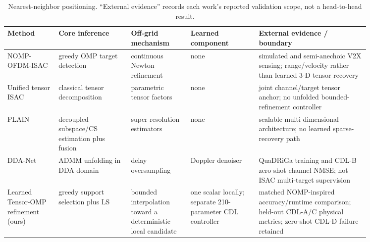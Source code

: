 \begin{table}[t]
\centering
\caption{Nearest-neighbor positioning. ``External evidence'' records each work's reported validation scope, not a head-to-head result.}
\label{tab:closest_work}
\footnotesize
\setlength{\tabcolsep}{3pt}
\begin{tabular}{p{0.12\linewidth}p{0.17\linewidth}p{0.14\linewidth}p{0.16\linewidth}p{0.26\linewidth}}
\toprule
Method & Core inference & Off-grid mechanism & Learned component & External evidence / boundary \\
\midrule
NOMP-OFDM-ISAC \cite{shah2024nomp_isac} & greedy OMP target detection & continuous Newton refinement & none & simulated and semi-anechoic V2X sensing; range/velocity rather than learned 3-D tensor recovery \\
Unified tensor ISAC \cite{zhang2024unified_tensor_isac} & classical tensor decomposition & parametric tensor factors & none & joint channel/target tensor anchor; no unfolded bounded-refinement controller \\
PLAIN \cite{tahir2025plain} & decoupled subspace/CS estimation plus fusion & super-resolution estimators & none & scalable multi-dimensional architecture; no learned sparse-recovery path \\
DDA-Net \cite{ma2026ddanet} & ADMM unfolding in DDA domain & delay oversampling & Doppler denoiser & QuaDRiGa training and CDL-B zero-shot channel NMSE; not ISAC multi-target supervision \\
Learned Tensor-OMP refinement (ours) & greedy support selection plus LS & bounded interpolation toward a deterministic local candidate & one scalar locally; separate 210-parameter CDL controller & matched NOMP-inspired accuracy/runtime comparison; held-out CDL-A/C physical metrics; zero-shot CDL-D failure retained \\
\bottomrule
\end{tabular}
\end{table}

